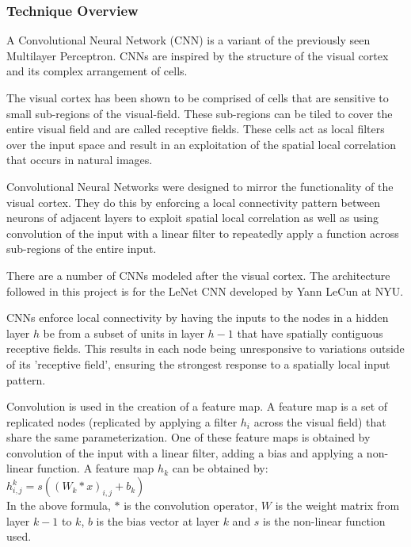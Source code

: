 \documentclass[12pt, titlepage]{article}
\begin{document}
  \subsubsection{Technique Overview}
  
  A Convolutional Neural Network (CNN) is a variant of the previously seen Multilayer Perceptron. CNNs are inspired by the
  structure of the visual cortex and its complex arrangement of cells.
  
  The visual cortex has been shown to be comprised of cells that are sensitive to small sub-regions of the visual-field. These
  sub-regions can be tiled to cover the entire visual field and are called receptive fields. These cells act as local filters
  over the input space and result in an exploitation of the spatial local correlation that occurs in natural images.
  
  Convolutional Neural Networks were designed to mirror the functionality of the visual cortex. They do this by enforcing a
  local connectivity pattern between neurons of adjacent layers to exploit spatial local correlation as well as using
  convolution of the input with a linear filter to repeatedly apply a function across sub-regions of the entire input.
  
  There are a number of CNNs modeled after the visual cortex. The architecture followed in this project is for the LeNet CNN
  developed by Yann LeCun at NYU.
  
  CNNs enforce local connectivity by having the inputs to the nodes in a hidden layer $h$ be from a subset of units in layer
  $h-1$ that have spatially contiguous receptive fields. This results in each node being unresponsive to variations outside
  of its 'receptive field', ensuring the strongest response to a spatially local input pattern.
  
  Convolution is used in the creation of a feature map. A feature map is a set of replicated nodes (replicated by applying a
  filter $h_{i}$ across the visual field) that share the same parameterization. One of these feature maps is obtained by
  convolution of the input with a linear filter, adding a bias and applying a non-linear function. A feature map $h_{k}$ can
  be obtained by: \\
  \vspace{1mm}
  \hspace{7mm}$h_{i,j}^{k} = s((W_{k} \ast x)_{i,j} + b_{k})$ \\
  In the above formula, $\ast$ is the convolution operator, $W$ is the weight matrix from layer $k-1$ to $k$, $b$ is the bias
  vector at layer $k$ and $s$ is the non-linear function used.
  
\end{document}
